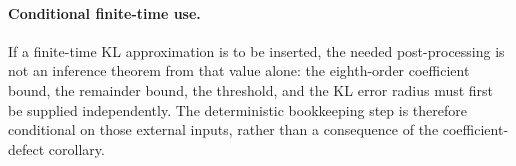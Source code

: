 \paragraph{Conditional finite-time use.}
If a finite-time KL approximation is to be inserted, the needed
post-processing is not an inference theorem from that value alone: the
eighth-order coefficient bound, the remainder bound, the threshold, and the
KL error radius must first be supplied independently.  The deterministic
bookkeeping step is therefore conditional on those external inputs, rather
than a consequence of the coefficient-defect corollary.
\endinput

